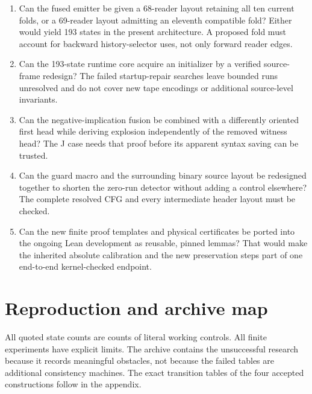 \documentclass[11pt,a4paper]{article}
\theoremstyle{definition}\newtheorem{definition}[theorem]{Definition}
\theoremstyle{remark}\newtheorem{remark}[theorem]{Remark}
\begin{document}
\begin{enumerate}
\item Can the fused emitter be given a 68-reader layout retaining all ten
current folds, or a 69-reader layout admitting an eleventh compatible fold?
Either would yield 193 states in the present architecture. A proposed
fold must account for backward history-selector uses, not only forward
reader edges.
\item Can the 193-state runtime core acquire an initializer by a verified
source-frame redesign? The failed startup-repair searches leave bounded
runs unresolved and do not cover new tape encodings or additional
source-level invariants.
\item Can the negative-implication fusion be combined with a differently
oriented first head while deriving explosion independently of the removed
witness head? The J case needs that proof before its apparent syntax
saving can be trusted.
\item Can the guard macro and the surrounding binary source layout be
redesigned together to shorten the zero-run detector without adding a
control elsewhere? The complete resolved CFG and every intermediate
header layout must be checked.
\item Can the new finite proof templates and physical certificates be
ported into the ongoing Lean development as reusable, pinned lemmas?
That would make the inherited absolute calibration and the new
preservation steps part of one end-to-end kernel-checked endpoint.
\end{enumerate}

\section{Reproduction and archive map}



All quoted state counts are counts of literal working controls. All finite
experiments have explicit limits. The archive contains the unsuccessful
research because it records meaningful obstacles, not because the failed
tables are additional consistency machines. The exact transition tables
of the four accepted constructions follow in the appendix.
\end{document}
